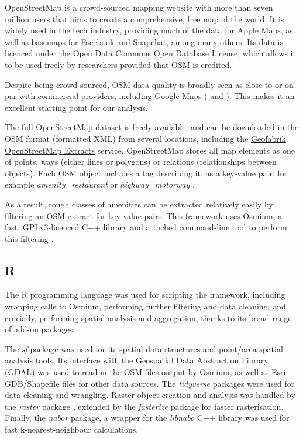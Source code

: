 \documentclass[12pt,a4paper]{article}
\begin{document}
OpenStreetMap \citep{osm:2021} is a crowd-sourced mapping website with more than seven million users that aims to create a comprehensive, free map of the world. It is widely used in the tech industry, providing much of the data for Apple Maps, as well as basemaps for Facebook and Snapchat, among many others. Its data is licenced under the Open Data Commons Open Database License, which allows it to be used freely by researchers provided that OSM is credited.

Despite being crowd-sourced, OSM data quality is broadly seen as close to or on par with commercial providers, including Google Maps (\citealt{ciepluch:2010} and \citealt{helbich:2012}). This makes it an excellent starting point for our analysis.

The full OpenStreetMap dataset is freely available, and can be downloaded in the OSM format (formatted XML) from several locations, including the \href{https://download.geofabrik.de/}{Geofabrik OpenStreetMap Extracts} service. OpenStreetMap stores all map elements as one of points, ways (either lines or polygons) or relations (relationships between objects). Each OSM object includes a tag describing it, as a key-value pair, for example \emph{amenity=restaurant} or \emph{highway=motorway} \citep{osm_cont:2021}. 

As a result, rough classes of amenities can be extracted relatively easily by filtering an OSM extract for key-value pairs. This framework uses Osmium, a fast, GPLv3-licenced C++ library and attached command-line tool to perform this filtering \citep{osmium:2021}.

\subsection{R}
\label{sec:r}

The R programming language \citep{r:2021} was used for scripting the framework, including wrapping calls to Osmium, performing further filtering and data cleaning, and crucially, performing spatial analysis and aggregation, thanks to its broad range of add-on packages. 

The \emph{sf} package \citep{sf:2018} was used for its spatial data structures and point/area spatial analysis tools. Its interface with the Geospatial Data Abstraction Library (GDAL) \citep{gdal:2021} was used to read in the OSM files output by Osmium, as well as Esri GDB/Shapefile files for other data sources. The \emph{tidyverse} packages \citep{tidyverse:2019} were used for data cleaning and wrangling. Raster object creation and analysis was handled by the \emph{raster} package \citep{raster:2021}, extended by the \emph{fasterize} package \citep{fasterize:2021} for faster rasterisation. Finally, the \emph{nabor} package, a wrapper for the \emph{libnabo} C++ library \citep{libnabo:2012} was used for fast  k-nearest-neighbour calculations.
\end{document}

